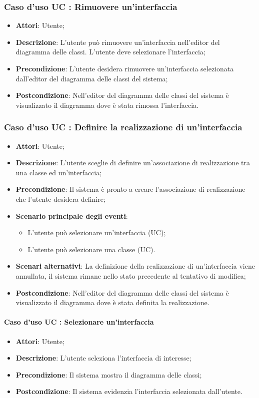 \documentclass[../AnalisiDeiRequisiti.tex]{subfiles}
\begin{document}
		\subsubsection{Caso d'uso UC : Rimuovere un'interfaccia}
			\begin{itemize}
				\item \textbf{Attori}: Utente;
				\item \textbf{Descrizione}: L'utente può rimuovere un'interfaccia nell'editor
				del diagramma delle classi. L'utente deve selezionare l'interfaccia;
				\item \textbf{Precondizione}: L'utente desidera rimuovere un'interfaccia
				selezionata dall'editor del diagramma delle classi del sistema;
				\item \textbf{Postcondizione}: Nell'editor del diagramma delle classi del
				sistema è visualizzato il diagramma dove è stata rimossa l'interfaccia.
			\end{itemize}
		\subsubsection{Caso d'uso UC : Definire la realizzazione di un'interfaccia}
			\begin{itemize}
				\item \textbf{Attori}: Utente;
				\item \textbf{Descrizione}: L'utente sceglie di definire un'associazione di
				realizzazione tra una classe ed un'interfaccia;
				\item \textbf{Precondizione}: Il sistema è pronto a creare l'associazione di
				realizzazione che l'utente desidera definire;
				\item \textbf{Scenario principale degli eventi}:
					\begin{itemize}
						\item L'utente può selezionare un'interfaccia (UC);
						\item L'utente può selezionare una classe (UC).
					\end{itemize}
				\item \textbf{Scenari alternativi}: La definizione della realizzazione di
				un'interfaccia viene annullata, il sistema rimane nello stato precedente al
				tentativo di modifica;
				\item \textbf{Postcondizione}: Nell'editor del diagramma delle classi del
				sistema è visualizzato il diagramma dove è stata definita la realizzazione.
			\end{itemize}
		\paragraph{Caso d'uso UC : Selezionare un'interfaccia}
			\begin{itemize}
				\item \textbf{Attori}: Utente;
				\item \textbf{Descrizione}: L'utente seleziona l'interfaccia di interesse;
				\item \textbf{Precondizione}: Il sistema mostra il diagramma delle classi;
				\item \textbf{Postcondizione}: Il sistema evidenzia l'interfaccia selezionata
				dall'utente.
			\end{itemize}
\end{document}
